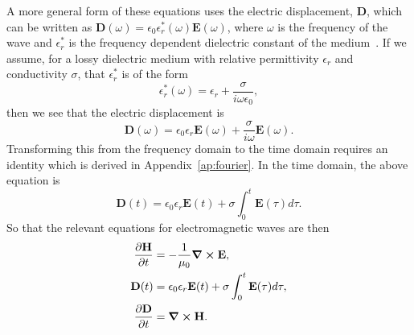 \documentclass[12pt,twocolumn]{article}
\begin{document}
A more general form of these equations uses the electric displacement, $\mathbf{D}$, which can be written as $\mathbf{D}(\omega) = \epsilon_0\epsilon_r^*(\omega)\mathbf{E}(\omega)$, where $\omega$ is the frequency of the wave and $\epsilon^*_r$ is the frequency dependent dielectric constant of the medium~\cite{Sullivan00}. If we assume, for a lossy dielectric medium with relative permittivity $\epsilon_r$ and conductivity $\sigma$, that $\epsilon^*_r$ is of the form
\begin{equation}
\epsilon^*_r(\omega) = \epsilon_r + \frac{\sigma}{i\omega\epsilon_0},
\end{equation}
then we see that the electric displacement is
\begin{equation}
\mathbf{D}(\omega) = \epsilon_0\epsilon_r \mathbf{E}(\omega) + \frac{\sigma}{i\omega}\mathbf{E}(\omega).
\end{equation}
Transforming this from the frequency domain to the time domain requires an identity which is derived in Appendix~\ref{ap:fourier}. In the time domain, the above equation is
\begin{equation}
\mathbf{D}(t) = \epsilon_0\epsilon_r \mathbf{E}(t)+\sigma\int_0^t\mathbf{E}(\tau)d\tau.
\end{equation}
So that the relevant equations for electromagnetic waves are then
\begin{subequations}
\begin{align}
\label{eq:dH_dt_SI}\frac{\partial\mathbf{H}}{\partial t} &= -\frac{1}{\mu_0}\curl{\mathbf{E}}, \\
\label{eq:D_time_SI}\mathbf{D}(t) &= \epsilon_0\epsilon_r \mathbf{E}(t)+\sigma\int_0^t\mathbf{E}(\tau)d\tau, \\
\label{eq:dD_dt_SI}\frac{\partial\mathbf{D}}{\partial t} &= \curl{\mathbf{H}}.
\end{align}
\end{subequations}
\end{document}
